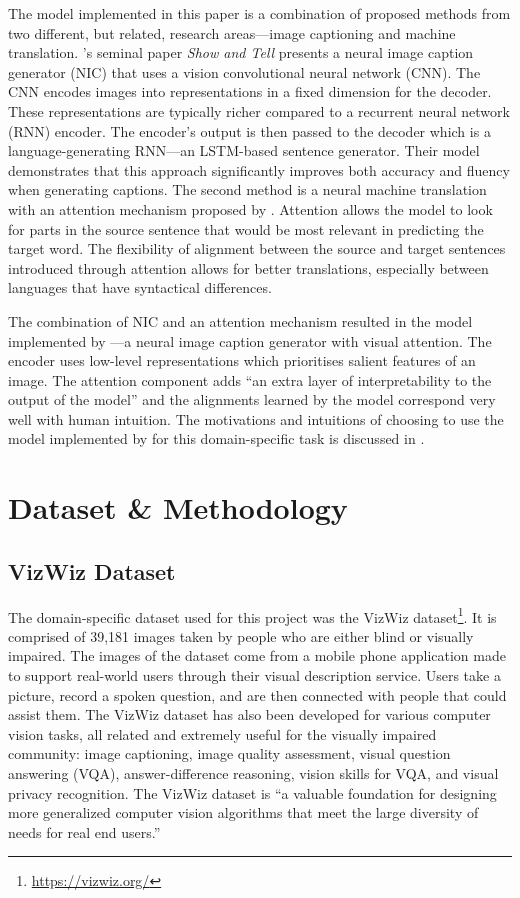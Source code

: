 \documentclass[11pt,a4paper]{article}
\begin{document}
The model implemented in this paper is a combination of proposed methods from two different, but related, research areas—image captioning and machine translation. \citet{Vinyals-2014-showandtell}’s seminal paper \emph{Show and Tell} presents a neural image caption generator (NIC) that uses a vision convolutional neural network (CNN). The CNN encodes images into representations in a fixed dimension for the decoder. These representations are typically richer compared to a recurrent neural network (RNN) encoder. The encoder’s output is then passed to the decoder which is a language-generating RNN—an LSTM-based sentence generator. Their model demonstrates that this approach significantly improves both accuracy and fluency when generating captions. The second method is a neural machine translation with an attention mechanism proposed by \citet{Bahdanau-2014-neural}. Attention allows the model to look for parts in the source sentence that would be most relevant in predicting the target word. The flexibility of alignment between the source and target sentences introduced through attention allows for better translations, especially between languages that have syntactical differences. 

The combination of NIC and an attention mechanism resulted in the model implemented by \citet{Xu-2015-show-attend}—a neural image caption generator with visual attention. The encoder uses low-level representations which prioritises salient features of an image. The attention component adds “an extra layer of interpretability to the output of the model” \citep{Xu-2015-show-attend} and the alignments learned by the model correspond very well with human intuition. The motivations and intuitions of choosing to use the model implemented by \citet{Xu-2015-show-attend} for this domain-specific task is discussed in . 


\section{Dataset \& Methodology}
\label{sec:datamethods}

\subsection{VizWiz Dataset}
\label{ssec:vizwizdataset}
The domain-specific dataset used for this project was the VizWiz dataset\footnote{\url{https://vizwiz.org/}}. It is comprised of 39,181 images taken by people who are either blind or visually impaired. The images of the dataset come from a mobile phone application made to support real-world users through their visual description service. Users take a picture, record a spoken question, and are then connected with people that could assist them. The VizWiz dataset has also been developed for various computer vision tasks, all related and extremely useful for the visually impaired community: image captioning, image quality assessment, visual question answering (VQA), answer-difference reasoning, vision skills for VQA, and visual privacy recognition. The VizWiz dataset is “a valuable foundation for designing more generalized computer vision algorithms that meet the large diversity of needs for real end users.” \citep{Gurari-2020-captioning} 
\end{document}
